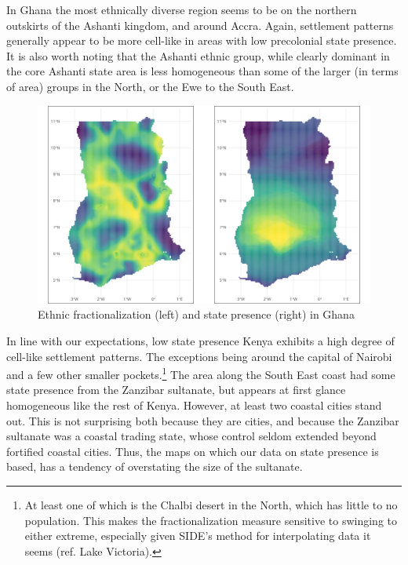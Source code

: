 In Ghana the most ethnically diverse region seems to be on the northern
outskirts of the Ashanti kingdom, and around Accra. Again, settlement patterns
generally appear to be more cell-like in areas with low precolonial state
presence. It is also worth noting that the Ashanti ethnic group, while clearly
dominant in the core Ashanti state area is less homogeneous than some of the
larger (in terms of area) groups in the North, or the Ewe to the South East.

\begin{figure}[htpb]
	\centering
	\includegraphics[width=1\linewidth]{img/ghaplots.png}
	\caption{Ethnic fractionalization (left) and state presence (right) in
	Ghana}%
	\label{ghaplots}
\end{figure}

In line with our expectations, low state presence Kenya exhibits a high degree
of cell-like settlement patterns. The exceptions being around the capital of
Nairobi and a few other smaller pockets.\footnote{At least one of which is the
	Chalbi desert in the North, which has little to no population. This
	makes the fractionalization measure sensitive to swinging to either
extreme, especially given SIDE's method for interpolating data it seems (ref.
Lake Victoria).} The area along the South East coast had some state presence
from the Zanzibar sultanate, but appears at first glance homogeneous like the
rest of Kenya. However, at least two coastal cities stand out. This is not
surprising both because they are cities, and because the Zanzibar sultanate was
a coastal trading state, whose control seldom extended beyond fortified coastal
cities. Thus, the maps on which our data on state presence is based, has a
tendency of overstating the size of the sultanate.

